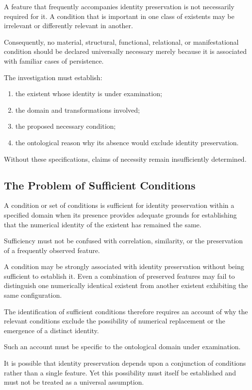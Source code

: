 A feature that frequently accompanies identity
preservation is not necessarily required for it.
A condition that is important in one class of
existents may be irrelevant or differently relevant
in another.

Consequently, no material, structural, functional,
relational, or manifestational condition should
be declared universally necessary merely because
it is associated with familiar cases of persistence.

The investigation must establish:

\begin{enumerate}
    \item the existent whose identity is under examination;
    \item the domain and transformations involved;
    \item the proposed necessary condition;
    \item the ontological reason why its absence would
    exclude identity preservation.
\end{enumerate}

Without these specifications, claims of necessity
remain insufficiently determined.

\subsection{The Problem of Sufficient Conditions}

A condition or set of conditions is sufficient
for identity preservation within a specified domain
when its presence provides adequate grounds for
establishing that the numerical identity of the
existent has remained the same.

Sufficiency must not be confused with correlation,
similarity, or the preservation of a frequently
observed feature.

A condition may be strongly associated with identity
preservation without being sufficient to establish it.
Even a combination of preserved features may fail
to distinguish one numerically identical existent
from another existent exhibiting the same configuration.

The identification of sufficient conditions therefore
requires an account of why the relevant conditions
exclude the possibility of numerical replacement
or the emergence of a distinct identity.

Such an account must be specific to the ontological
domain under examination.

It is possible that identity preservation depends
upon a conjunction of conditions rather than a
single feature. Yet this possibility must itself
be established and must not be treated as a
universal assumption.


